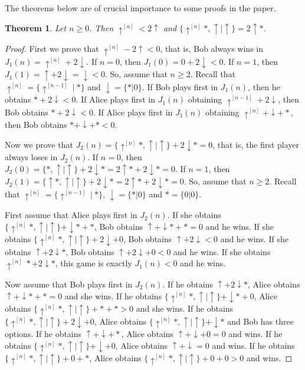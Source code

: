 \documentclass[a4paper,11pt]{article}
\newtheorem{theorem}{Theorem}
\begin{document}
The theorems below are of crucial importance to some proofs in the paper.

\begin{theorem}\label{thm-basic3}
Let $n\geq 0$. Then $\uparrow^{[n]}<2\uparrow$ and $\{\uparrow^{[n]}*,\uparrow|\uparrow\}=2\uparrow*$.
\end{theorem}

\begin{proof}
First we prove that $\uparrow^{[n]}-2\uparrow<0$, that is, Bob always wins in $J_1(n)=\uparrow^{[n]}+2\downarrow$.
If $n=0$, then $J_1(0)=0+2\downarrow<0$.
If $n=1$, then $J_1(1)=\uparrow+2\downarrow=\downarrow<0$.
So, assume that $n\geq 2$.
Recall that $\uparrow^{[n]}=\{\uparrow^{[n-1]}\ |\ *\}$ and $\downarrow=\{*|0\}$.
If Bob plays first in $J_1(n)$, then he obtains $*+2\downarrow<0$.
If Alice plays first in $J_1(n)$ obtaining $\uparrow^{[n-1]}+2\downarrow$, then Bob obtains $*+2\downarrow<0$.
If Alice plays first in $J_1(n)$ obtaining $\uparrow^{[n]}+\downarrow+*$, then Bob obtains $*+\downarrow+*<0$.

Now we prove that $J_2(n)=\{\uparrow^{[n]}*,\uparrow|\uparrow\}+2\downarrow*=0$, that is, the first player always loses in $J_2(n)$.
If $n=0$, then $J_2(0)=\{*,\uparrow|\uparrow\}+2\downarrow*=2\uparrow*+2\downarrow*=0$.
If $n=1$, then $J_2(1)=\{\uparrow*,\uparrow|\uparrow\}+2\downarrow*=2\uparrow*+2\downarrow*=0$.
So, assume that $n\geq 2$.
Recall that $\uparrow^{[n]}=\{\uparrow^{[n-1]}\ |\ *\}$, $\downarrow=\{*|0\}$ and $*=\{0|0\}$.

First assume that Alice plays first in $J_2(n)$.
If she obtains $\{\uparrow^{[n]}*,\uparrow|\uparrow\}+\downarrow*+*$, Bob obtains $\uparrow+\downarrow*+*=0$ and he wins.
If she obtains $\{\uparrow^{[n]}*,\uparrow|\uparrow\}+2\downarrow+0$, Bob obtains $\uparrow+2\downarrow<0$ and he wins.
If she obtains $\uparrow+2\downarrow*$, Bob obtains $\uparrow+2\downarrow+0<0$ and he wins.
If she obtains $\uparrow^{[n]}*+2\downarrow*$, this game is exactly $J_1(n)<0$ and he wins.

Now assume that Bob plays first in $J_2(n)$.
If he obtains $\uparrow+2\downarrow*$, Alice obtains $\uparrow+\downarrow*+*=0$ and she wins.
If he obtains $\{\uparrow^{[n]}*,\uparrow|\uparrow\}+\downarrow*+0$, Alice obtains $\{\uparrow^{[n]}*,\uparrow|\uparrow\}+*+*>0$ and she wins.
If he obtains $\{\uparrow^{[n]}*,\uparrow|\uparrow\}+2\downarrow+0$, Alice obtains $\{\uparrow^{[n]}*,\uparrow|\uparrow\}+\downarrow*$ and Bob has three options.
If he obtains $\uparrow+\downarrow+*$, Alice obtains $\uparrow+\downarrow+0=0$ and wins.
If he obtains $\{\uparrow^{[n]}*,\uparrow|\uparrow\}+\downarrow+0$, Alice obtains $\uparrow+\downarrow=0$ and wins.
If he obtains $\{\uparrow^{[n]}*,\uparrow|\uparrow\}+0+*$, Alice obtains $\{\uparrow^{[n]}*,\uparrow|\uparrow\}+0+0>0$ and wins.
\end{proof}
\end{document}
